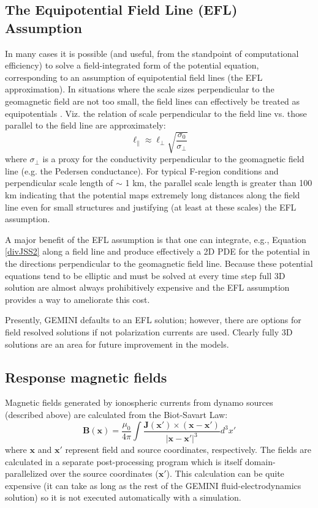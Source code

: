 \documentclass[11pt,letterpaper]{article}
\begin{document}
\subsection{The Equipotential Field Line (EFL) Assumption}

In many cases it is possible (and useful, from the standpoint of computational efficiency) to solve a field-integrated form of the potential equation, corresponding to an assumption of equipotential field lines (the EFL approximation).  In situations where the scale sizes perpendicular to the geomagnetic field are not too small, the field lines can effectively be treated as equipotentials \citep[e.g.][]{Farley:1959,Huba:1988}.  Viz. the relation of scale perpendicular to the field line vs. those parallel to the field line are approximately:
\begin{equation}
\ell_\parallel \approx \ell_\perp \sqrt{ \frac{\sigma_0}{\sigma_\perp} } 
\end{equation}
where $\sigma_\perp$ is a proxy for the conductivity perpendicular to the geomagnetic field line (e.g. the Pedersen conductance).  For typical F-region conditions and perpendicular scale length of $\sim$ 1 km, the parallel scale length is greater than 100 km indicating that the potential maps extremely long distances along the field line even for small structures and justifying (at least at these scales) the EFL assumption.  

A major benefit of the EFL assumption is that one can integrate, e.g., Equation \ref{divJSS2} along a field line and produce effectively a 2D PDE for the potential in the directions perpendicular to the geomagnetic field line.  Because these potential equations tend to be elliptic and must be solved at every time step full 3D solution are almost always prohibitively expensive and the EFL assumption provides a way to ameliorate this cost.  

Presently, GEMINI defaults to an EFL solution; however, there are options for field resolved solutions if not polarization currents are used.  Clearly fully 3D solutions are an area for future improvement in the models.  

\subsection{Response magnetic fields}

Magnetic fields generated by ionospheric currents from dynamo sources (described above) are calculated from the Biot-Savart Law:
\begin{equation}
  \mathbf{B}(\mathbf{x}) = \frac{\mu_0}{4 \pi} \int \frac{\mathbf{J}(\mathbf{x}') \times (\mathbf{x} - \mathbf{x}')}{|\mathbf{x} - \mathbf{x}'|^3} d^3 x'
\end{equation}
where $\mathbf{x}$ and $\mathbf{x'}$ represent field and source coordinates, respectively.  The fields are calculated in a separate post-processing program which is itself domain-parallelized over the source coordinates ($\mathbf{x}'$).  This calculation can be  quite expensive (it can take as long as the rest of the GEMINI fluid-electrodynamics solution) so it is not executed automatically with a simulation.  
\end{document}
